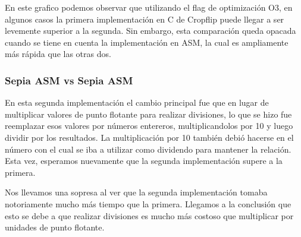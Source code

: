\documentclass[a4paper]{article}
\begin{document}
En este grafico podemos observar que utilizando el flag de optimización O3, en algunos casos la primera implementación en C de Cropflip puede llegar
a ser levemente superior a la segunda. Sin embargo, esta comparación queda opacada cuando se tiene en cuenta la implementación en ASM, la cual es
ampliamente más rápida que las otras dos.

\subsubsection{Sepia ASM vs Sepia ASM}
En esta segunda implementación el cambio principal fue que en lugar de multiplicar valores de punto flotante para realizar divisiones, lo que se hizo
fue reemplazar esos valores por números entereros, multiplicandolos por 10 y luego dividir por los resultados. La multiplicación por 10 también debió hacerse
en el número con el cual se iba a utilizar como dividendo para mantener la relación. Esta vez, esperamos nuevamente que la segunda implementación supere a la primera.

\begin{figure}[!ht]
    \centering
    \begin{floatrow}
    \end{floatrow}
\end{figure}

Nos llevamos una sopresa al ver que la segunda implementación tomaba notoriamente mucho más tiempo que la primera. Llegamos a la conclusión que esto se debe
a que realizar divisiones es mucho más costoso que multiplicar por unidades de punto flotante.
\end{document}
